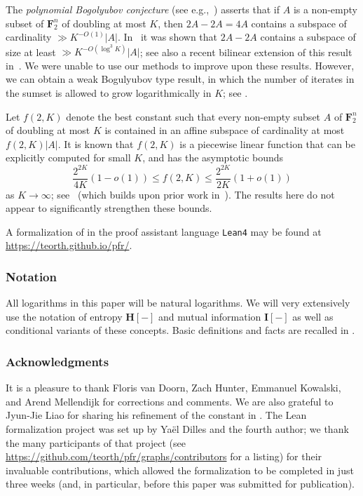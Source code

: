 \documentclass[12pt,reqno,tbtags]{amsart}
\theoremstyle{definition}
\theoremstyle{remark}
\renewcommand{\leq}{\leqslant}
\def\F{\mathbf{F}}
\newcommand{\ent}[1]{\mathbf{H}[#1]}
\newcommand{\I}[1]{\mathbf{I}[#1]}
\numberwithin{equation}{section}
\begin{document}
The \emph{polynomial Bogolyubov conjecture} (see e.g.,~\cite[Conjecture 1.5]{lovett-survey}) asserts that if $A$ is a non-empty subset of $\F_2^n$ of doubling at most $K$, then $2A-2A=4A$ contains a subspace of cardinality $\gg K^{-O(1)} |A|$.  In~\cite{sanders} it was shown that $2A-2A$ contains a subspace of size at least $\gg K^{-O(\log^3 K)} |A|$; see also a recent bilinear extension of this result in~\cite{hosseini-lovett}.  We were unable to use our methods to improve upon these results.  However, we can obtain a weak Bogulyubov type result, in which the number of iterates in the sumset is allowed to grow logarithmically in $K$; see .

Let $f(2,K)$ denote the best constant such that every non-empty subset $A$ of $\F_2^n$ of doubling at most $K$ is contained in an affine subspace of cardinality at most $f(2,K) |A|$.  It is known that $f(2,K)$ is a piecewise linear function that can be explicitly computed for small $K$, and has the asymptotic bounds
\[ \frac{2^{2K}}{4K} (1-o(1)) \leq f(2,K) \leq \frac{2^{2K}}{2K}(1+o(1))\]
as $K \to \infty$; see~\cite{even-zohar} (which builds upon prior work in~\cite{diao, gt-freiman, konyagin}).  The results here do not appear to significantly strengthen these bounds.

A formalization of  in the proof assistant language {\tt Lean4} may be found at \url{https://teorth.github.io/pfr/}.

\subsubsection*{Notation}
All logarithms in this paper will be natural logarithms. We will very extensively use the notation of entropy $\ent{-}$ and mutual information $\I{-}$ as well as conditional variants of these concepts. Basic definitions and facts are recalled in .

\subsubsection*{Acknowledgments}

It is a pleasure to thank Floris van Doorn, Zach Hunter, Emmanuel Kowalski, and Arend Mellendijk for corrections and comments.  We are also grateful to Jyun-Jie Liao for sharing his refinement of the constant in .  The Lean formalization project was set up by Ya\"el Dilles and the fourth author; we thank the many participants of that project (see \url{https://github.com/teorth/pfr/graphs/contributors} for a listing) for their invaluable contributions, which allowed the formalization to be completed in just three weeks (and, in particular, before this paper was submitted for publication).
\end{document}
